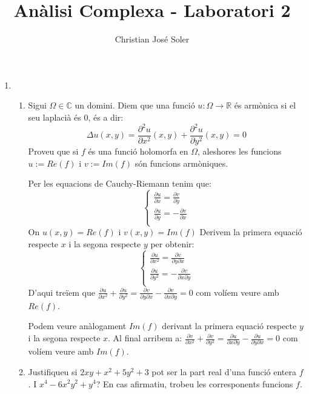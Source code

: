 \documentclass[10pt,a4paper]{article}
\author{Christian José Soler}
\title{Anàlisi Complexa - Laboratori 2}
\begin{document}
\maketitle

\begin{enumerate}
\item
	\begin{enumerate}
	\item Sigui $\Omega\in\mathbb{C}$ un domini. Diem que una funció $u:\Omega\rightarrow\mathbb{R}$ és armònica si el seu laplacià és 0, és a dir:
	$$\Delta u(x,y)=\frac{\partial^{2}u}{\partial x^{2}}(x,y) + \frac{\partial^{2}u}{\partial y^{2}}(x,y)=0$$
	Proveu que si $f$ és una funció holomorfa en $\Omega$, aleshores les funcions $u:=Re(f)$ i $v:=Im(f)$ són funcions armòniques.
	\begin{framed}
	
	Per les equacions de Cauchy-Riemann tenim que:
	$$
	\begin{cases}
		\frac{\partial u}{\partial x} = \frac{\partial v}{\partial y} \\
		\frac{\partial u}{\partial y} = -\frac{\partial v}{\partial x} \\
	\end{cases}
	$$
	On $u(x,y)=Re(f)$ i $v(x,y)=Im(f)$
	Derivem la primera equació respecte $x$ i la segona respecte $y$ per obtenir:
	$$
	\begin{cases}
		\frac{\partial u}{\partial x^{2}} = \frac{\partial v}{\partial y \partial x} \\
		\frac{\partial u}{\partial y^{2}} = -\frac{\partial v}{\partial x \partial y} \\
	\end{cases}
	$$	
	D'aqui treïem que $\frac{\partial u}{\partial x^{2}} + \frac{\partial u}{\partial y^{2}} = \frac{\partial v}{\partial y \partial x} - \frac{\partial v}{\partial x \partial y} = 0$ com volíem veure amb $Re(f)$.
	
	Podem veure anàlogament $Im(f)$ derivant la primera equació respecte $y$ i la segona respecte $x$. Al final arribem a: $\frac{\partial v}{\partial x^{2}} + \frac{\partial v}{\partial y^{2}} = \frac{\partial u}{\partial x \partial y} - \frac{\partial u}{\partial y \partial x} = 0$ com volíem veure amb $Im(f)$.
	\end{framed}
	\item Justifiqueu si $2xy+x^{2}+5y^{2}+3$ pot ser la part real d'una funció entera $f$. I $x^{4}-6x^{2}y^{2}+y^{4}$? En cas afirmatiu, trobeu les corresponents funcions $f$.


\end{enumerate}
\end{enumerate}
\end{document}
